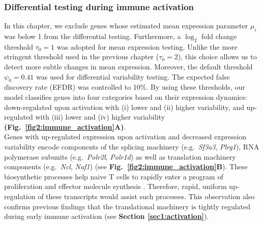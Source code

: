 \subsubsection{Differential testing during immune activation}

In this chapter, we exclude genes whose estimated mean expression parameter $\mu_i$ was below 1 from the differential testing. Furthermore, a $\log_2$ fold change threshold $\tau_0 = 1$ was adopted for mean expression testing. Unlike the more stringent threshold used in the previous chapter ($\tau_0 = 2$), this choice allows us to detect more subtle changes in mean expression. Moreover, the default threshold $\psi_0 = 0.41$ was used for differential variability testing. The expected false discovery rate (EFDR) was controlled to 10\%. By using these thresholds, our model classifies genes into four categories based on their expression dynamics: down-regulated upon activation with (i) lower and (ii) higher variability, and up-regulated with (iii) lower and (iv) higher variability \textbf{(Fig.~\ref{fig2:immune_activation}A)}. \\

Genes with up-regulated expression upon activation and decreased expression variability encode components of the splicing machinery (e.g.~\textit{Sf3a3}, \textit{Plrg1}), RNA polymerase subunits (e.g.~\textit{Polr2l}, \textit{Polr1d}) as well as translation machinery components (e.g.~\textit{Ncl}, \textit{Naf1}) (see \textbf{Fig.~\ref{fig2:immune_activation}B}). These biosynthetic processes help naive T cells to rapidly enter a program of proliferation and effector molecule synthesis \citep{Tan2017,Araki2017}. Therefore, rapid, uniform up-regulation of these transcripts would assist such processes. This observation also confirms previous findings that the translational machinery is tightly regulated during early immune activation (see \textbf{Section \ref{sec1:activation}}).

